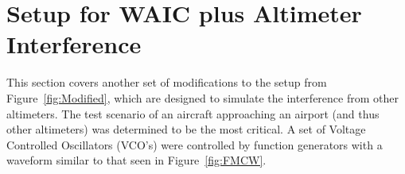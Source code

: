 \section{Setup for WAIC plus Altimeter Interference}
This section covers another set of modifications to the setup from Figure~\ref{fig:Modified}, which are designed to simulate the interference from other altimeters. The test scenario of an aircraft approaching an airport (and thus other altimeters) was determined to be the most critical. A set of Voltage Controlled Oscillators (VCO's) were controlled by function generators with a waveform similar to that seen in Figure~\ref{fig:FMCW}.


